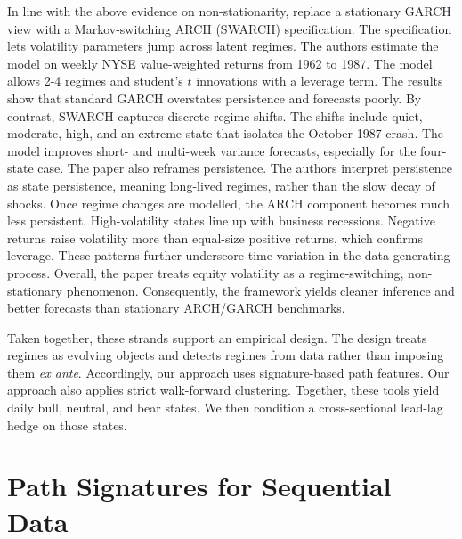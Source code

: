 In line with the above evidence on non-stationarity, \cite{HAMILTON1994307} replace a stationary GARCH view with a Markov-switching ARCH (SWARCH) specification. The specification lets volatility parameters jump across latent regimes. The authors estimate the model on weekly NYSE value-weighted returns from 1962 to 1987. The model allows 2-4 regimes and student's $t$ innovations with a leverage term. The results show that standard GARCH overstates persistence and forecasts poorly. By contrast, SWARCH captures discrete regime shifts. The shifts include quiet, moderate, high, and an extreme state that isolates the October 1987 crash. The model improves short- and multi-week variance forecasts, especially for the four-state case. The paper also reframes persistence. The authors interpret persistence as state persistence, meaning long-lived regimes, rather than the slow decay of shocks. Once regime changes are modelled, the ARCH component becomes much less persistent. High-volatility states line up with business recessions. Negative returns raise volatility more than equal-size positive returns, which confirms leverage. These patterns further underscore time variation in the data-generating process. Overall, the paper treats equity volatility as a regime-switching, non-stationary phenomenon. Consequently, the framework yields cleaner inference and better forecasts than stationary ARCH/GARCH benchmarks.

Taken together, these strands support an empirical design. The design treats regimes as evolving objects and detects regimes from data rather than imposing them \emph{ex ante}. Accordingly, our approach uses signature-based path features. Our approach also applies strict walk-forward clustering. Together, these tools yield daily bull, neutral, and bear states. We then condition a cross-sectional lead-lag hedge on those states.

\section{Path Signatures for Sequential Data}

